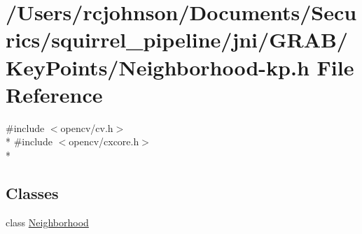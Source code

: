 \hypertarget{_neighborhood-kp_8h}{\section{/\-Users/rcjohnson/\-Documents/\-Securics/squirrel\-\_\-pipeline/jni/\-G\-R\-A\-B/\-Key\-Points/\-Neighborhood-\/kp.h File Reference}
\label{_neighborhood-kp_8h}
}
{\ttfamily \#include $<$opencv/cv.\-h$>$}\\*
{\ttfamily \#include $<$opencv/cxcore.\-h$>$}\\*
\subsection*{Classes}
\begin{DoxyCompactItemize}
\item 
class \hyperlink{class_neighborhood}{Neighborhood}
\end{DoxyCompactItemize}
